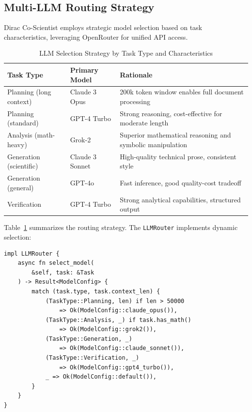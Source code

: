 \documentclass{ieeeaccess}
\begin{document}
\subsection{Multi-LLM Routing Strategy}

Dirac Co-Scientist employs strategic model selection based on task characteristics, leveraging OpenRouter for unified API access.

\begin{table}[!t]
\caption{LLM Selection Strategy by Task Type and Characteristics}
\label{tab:llm-routing}
\centering
\renewcommand{\arraystretch}{1.3}
\small
\begin{tabular}{p{2.0cm}p{2.0cm}p{4.2cm}}
\toprule
\textbf{Task Type} & \textbf{Primary Model} & \textbf{Rationale} \\
\midrule
Planning (long context) & Claude 3 Opus & 200k token window enables full document processing \\
\midrule
Planning (standard) & GPT-4 Turbo & Strong reasoning, cost-effective for moderate length \\
\midrule
Analysis (math-heavy) & Grok-2 & Superior mathematical reasoning and symbolic manipulation \\
\midrule
Generation (scientific) & Claude 3 Sonnet & High-quality technical prose, consistent style \\
\midrule
Generation (general) & GPT-4o & Fast inference, good quality-cost tradeoff \\
\midrule
Verification & GPT-4 Turbo & Strong analytical capabilities, structured output \\
\bottomrule
\end{tabular}
\normalsize
\end{table}

Table~\ref{tab:llm-routing} summarizes the routing strategy. The \texttt{LLMRouter} implements dynamic selection:

\begin{lstlisting}[style=codestyle, float=!t, caption={LLM routing implementation}, label=lst:llm-router, basicstyle=\ttfamily\footnotesize, numbers=none]
impl LLMRouter {
    async fn select_model(
        &self, task: &Task
    ) -> Result<ModelConfig> {
        match (task.type, task.context_len) {
            (TaskType::Planning, len) if len > 50000 
                => Ok(ModelConfig::claude_opus()),
            (TaskType::Analysis, _) if task.has_math() 
                => Ok(ModelConfig::grok2()),
            (TaskType::Generation, _) 
                => Ok(ModelConfig::claude_sonnet()),
            (TaskType::Verification, _) 
                => Ok(ModelConfig::gpt4_turbo()),
            _ => Ok(ModelConfig::default()),
        }
    }
}
\end{lstlisting}
\end{document}
